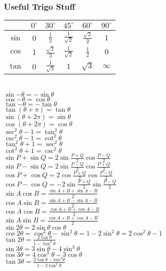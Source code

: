 \documentclass[10 pt]{article}
\makeatletter
\newenvironment{tablehere}
  {\def\@captype{table}}
  {}
\makeatother
\begin{document}
\begin{multicols}{2}
\subsubsection*{Useful Trigo Stuff}
\begin{tablehere}
\begin{tabular} {| c | c | c | c | c | c |}
\hline
 & $0^\circ$ & $30^\circ$ & $45^\circ$ & $60^\circ$ & $90^\circ$ \\
\hline
$\sin$ & 0 & $\frac{1}{2}$ & $\frac{1}{\sqrt{2}}$ & $\frac{\sqrt{3}}{2}$ & $1$ \\
\hline
$\cos$ & 1 & $\frac{\sqrt{3}}{2}$ & $\frac{1}{\sqrt{2}}$ & $\frac{1}{2}$ & $0$ \\
\hline
$\tan$ & 0 & $\frac{1}{\sqrt{3}}$ & $1$ & $\sqrt{3}$ & $\infty$ \\
\hline
\end{tabular}
\end{tablehere}\\
$\sin{-\theta} = -\sin{\theta}$\\
$\cos{-\theta} = \cos{\theta}$\\
$\tan{-\theta} = -\tan{\theta}$\\
$\tan{(\theta + \pi)} = \tan{\theta}$\\
$\sin{(\theta + 2\pi)}  = \sin{\theta}$\\
$\cos{(\theta + 2\pi)}  = \cos{\theta}$\\
$\sec^2{\theta} - 1 = \tan^2{\theta}$\\
$\csc^2{\theta} - 1 = \cot^2{\theta}$\\
$\tan^2{\theta} + 1 = \sec^2{\theta}$\\
$\cot^2{\theta} + 1 = \csc^2{\theta}$\\
$\sin{P} + \sin{Q} = 2\sin{\frac{P+Q}{2}}\cos{\frac{P-Q}{2}}$\\
$\sin{P} - \sin{Q} = 2\sin{\frac{P-Q}{2}}\cos{\frac{P+Q}{2}}$\\
$\cos{P} + \cos{Q} = 2\cos{\frac{P+Q}{2}}\cos{\frac{P-Q}{2}}$\\
$\cos{P} - \cos{Q} = -2\sin{\frac{P+Q}{2}}\sin{\frac{P-Q}{2}}$\\
$\sin{A}\cos{B} = \frac{\sin{A+B}+\sin{A-B}}{2}$\\
$\cos{A}\sin{B} = \frac{\sin{A+B}-\sin{A-B}}{2}$\\
$\cos{A}\cos{B} = \frac{\cos{A+B}+\cos{A-B}}{2}$\\
$\sin{A}\sin{B} = \frac{\cos{A+B}+\cos{A-B}}{2}$\\
$\sin{2\theta}=2\sin{\theta}\cos{\theta}$\\
$\cos{2\theta}=\cos^{2}{\theta}-\sin^{2}{\theta}=1-2\sin^{2}{\theta}=2\cos^2{\theta}-1$\\
$\tan{2\theta}=\frac{2\tan{\theta}}{1-\tan^{2}{\theta}}$\\
$\sin{3\theta}=3\sin{\theta}-4\sin^3{\theta}$\\
$\cos{3\theta}=4\cos^3{\theta}-3\cos{\theta}$\\
$\tan{3\theta}=\frac{3\tan{\theta}-tan^3{\theta}}{1-3\tan^2{\theta}}$

\end{multicols}
\end{document}
